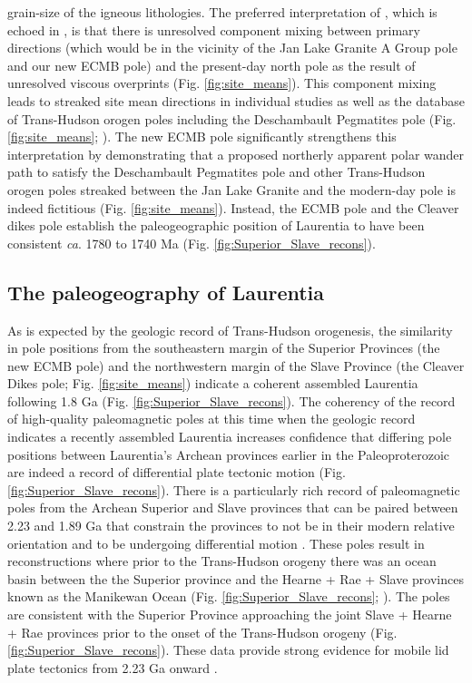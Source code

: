 \documentclass[draft]{agujournal2019}
\begin{document}
grain-size of the igneous lithologies. The preferred interpretation of , which is echoed in , is that there is unresolved component mixing between primary directions (which would be in the vicinity of the Jan Lake Granite A Group pole and our new ECMB pole) and the present-day north pole as the result of unresolved viscous overprints (Fig. \ref{fig:site_means}). This component mixing leads to streaked site mean directions in individual studies as well as the database of Trans-Hudson orogen poles including the Deschambault Pegmatites pole (Fig. \ref{fig:site_means}; ). The new ECMB pole significantly strengthens this interpretation by demonstrating that a proposed northerly apparent polar wander path to satisfy the Deschambault Pegmatites pole and other Trans-Hudson orogen poles streaked between the Jan Lake Granite and the modern-day pole is indeed fictitious (Fig. \ref{fig:site_means}). Instead, the ECMB pole and the Cleaver dikes pole establish the paleogeographic position of Laurentia to have been consistent \textit{ca}. 1780 to 1740 Ma (Fig. \ref{fig:Superior_Slave_recons}).
 
\subsection{The paleogeography of Laurentia}

As is expected by the geologic record of Trans-Hudson orogenesis, the similarity in pole positions from the southeastern margin of the Superior Provinces (the new ECMB pole) and the northwestern margin of the Slave Province (the Cleaver Dikes pole; Fig. \ref{fig:site_means}) indicate a coherent assembled Laurentia following 1.8 Ga (Fig. \ref{fig:Superior_Slave_recons}). The coherency of the record of high-quality paleomagnetic poles at this time when the geologic record indicates a recently assembled Laurentia increases confidence that differing pole positions between Laurentia's Archean provinces earlier in the Paleoproterozoic are indeed a record of differential plate tectonic motion (Fig. \ref{fig:Superior_Slave_recons}). There is a particularly rich record of paleomagnetic poles from the Archean Superior and Slave provinces that can be paired between 2.23 and 1.89 Ga that constrain the provinces to not be in their modern relative orientation and to be undergoing differential motion \cite{Mitchell2014a, Buchan2016a, Swanson-Hysell2021a}. These poles result in reconstructions where prior to the Trans-Hudson orogeny there was an ocean basin between the the Superior province and the Hearne + Rae + Slave provinces known as the Manikewan Ocean (Fig. \ref{fig:Superior_Slave_recons}; ). The poles are consistent with the Superior Province approaching the joint Slave + Hearne + Rae provinces prior to the onset of the Trans-Hudson orogeny (Fig. \ref{fig:Superior_Slave_recons}). These data provide strong evidence for mobile lid plate tectonics from 2.23 Ga onward \cite{Mitchell2014a, Buchan2016a, Swanson-Hysell2021a}.
\end{document}
